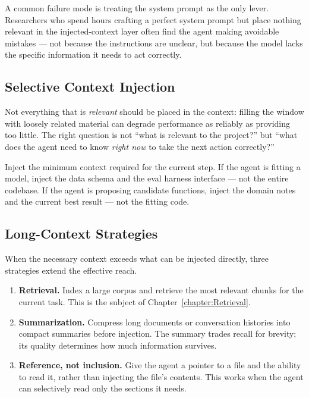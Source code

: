\begin{remark}
A common failure mode is treating the system prompt as the only lever.
Researchers who spend hours crafting a perfect system prompt but place nothing relevant in the injected-context layer often find the agent making avoidable mistakes — not because the instructions are unclear, but because the model lacks the specific information it needs to act correctly.
\end{remark}

\subsection{Selective Context Injection}

Not everything that is \emph{relevant} should be placed in the context: filling the window with loosely related material can degrade performance as reliably as providing too little.
The right question is not ``what is relevant to the project?'' but ``what does the agent need to know \emph{right now} to take the next action correctly?''

\begin{principle}
\label{principle:SelectiveContext}
Inject the minimum context required for the current step.
If the agent is fitting a model, inject the data schema and the eval harness interface — not the entire codebase.
If the agent is proposing candidate functions, inject the domain notes and the current best result — not the fitting code.
\end{principle}

\subsection{Long-Context Strategies}

When the necessary context exceeds what can be injected directly, three strategies extend the effective reach.

\begin{enumerate}
\item \textbf{Retrieval.} Index a large corpus and retrieve the most relevant chunks for the current task.
This is the subject of Chapter~\ref{chapter:Retrieval}.

\item \textbf{Summarization.} Compress long documents or conversation histories into compact summaries before injection.
The summary trades recall for brevity; its quality determines how much information survives.

\item \textbf{Reference, not inclusion.} Give the agent a pointer to a file and the ability to read it, rather than injecting the file's contents.
This works when the agent can selectively read only the sections it needs.
\end{enumerate}

